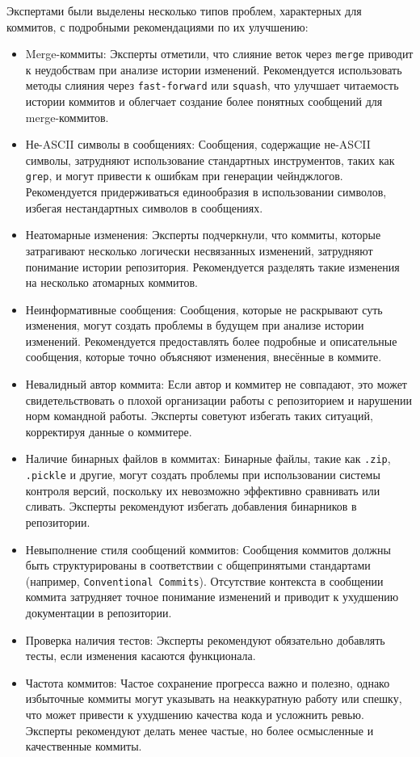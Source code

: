 Экспертами были выделены несколько типов проблем, характерных для коммитов, с подробными рекомендациями по их улучшению:

\begin{itemize}
	\item Merge-коммиты: Эксперты отметили, что слияние веток через \texttt{merge} приводит к неудобствам при анализе истории изменений. Рекомендуется использовать методы слияния через \texttt{fast-forward} или \texttt{squash}, что улучшает читаемость истории коммитов и облегчает создание более понятных сообщений для merge-коммитов.
	\item Не-ASCII символы в сообщениях: Сообщения, содержащие не-ASCII символы, затрудняют использование стандартных инструментов, таких как \texttt{grep}, и могут привести к ошибкам при генерации чейнджлогов. Рекомендуется придерживаться единообразия в использовании символов, избегая нестандартных символов в сообщениях.
	\item Неатомарные изменения: Эксперты подчеркнули, что коммиты, которые затрагивают несколько логически несвязанных изменений, затрудняют понимание истории репозитория. Рекомендуется разделять такие изменения на несколько атомарных коммитов.
	\item Неинформативные сообщения: Сообщения, которые не раскрывают суть изменения, могут создать проблемы в будущем при анализе истории изменений. Рекомендуется предоставлять более подробные и описательные сообщения, которые точно объясняют изменения, внесённые в коммите.
	\item Невалидный автор коммита: Если автор и коммитер не совпадают, это может свидетельствовать о плохой организации работы с репозиторием и нарушении норм командной работы. Эксперты советуют избегать таких ситуаций, корректируя данные о коммитере.
	\item Наличие бинарных файлов в коммитах: Бинарные файлы, такие как \texttt{.zip}, \texttt{.pickle} и другие, могут создать проблемы при использовании системы контроля версий, поскольку их невозможно эффективно сравнивать или сливать. Эксперты рекомендуют избегать добавления бинарников в репозитории.
	\item Невыполнение стиля сообщений коммитов: Сообщения коммитов должны быть структурированы в соответствии с общепринятыми стандартами (например, \texttt{Conventional Commits}). Отсутствие контекста в сообщении коммита затрудняет точное понимание изменений и приводит к ухудшению документации в репозитории.
	\item Проверка наличия тестов: Эксперты рекомендуют обязательно добавлять тесты, если изменения касаются функционала.
	\item Частота коммитов: Частое сохранение прогресса важно и полезно, однако избыточные коммиты могут указывать на неаккуратную работу или спешку, что может привести к ухудшению качества кода и усложнить ревью. Эксперты рекомендуют делать менее частые, но более осмысленные и качественные коммиты.
\end{itemize}

